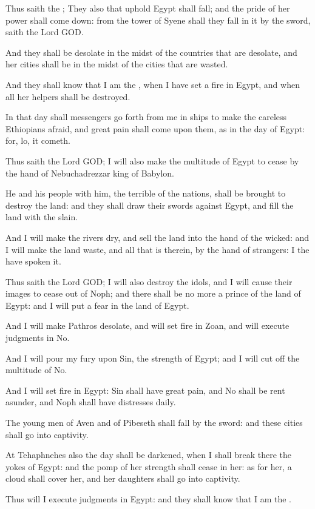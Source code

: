 \Verse Thus saith the \LORD; They also that uphold Egypt shall fall; and the pride of her power shall come down: from the tower of Syene shall they fall in it by the sword, saith the Lord GOD.

\Verse And they shall be desolate in the midst of the countries that are desolate, and her cities shall be in the midst of the cities that are wasted.

\Verse And they shall know that I am the \LORD, when I have set a fire in Egypt, and when all her helpers shall be destroyed.

\Verse In that day shall messengers go forth from me in ships to make the careless Ethiopians afraid, and great pain shall come upon them, as in the day of Egypt: for, lo, it cometh.

\Verse Thus saith the Lord GOD; I will also make the multitude of Egypt to cease by the hand of Nebuchadrezzar king of Babylon.

\Verse He and his people with him, the terrible of the nations, shall be brought to destroy the land: and they shall draw their swords against Egypt, and fill the land with the slain.

\Verse And I will make the rivers dry, and sell the land into the hand of the wicked: and I will make the land waste, and all that is therein, by the hand of strangers: I the \LORD have spoken it.

\Verse Thus saith the Lord GOD; I will also destroy the idols, and I will cause their images to cease out of Noph; and there shall be no more a prince of the land of Egypt: and I will put a fear in the land of Egypt.

\Verse And I will make Pathros desolate, and will set fire in Zoan, and will execute judgments in No.

\Verse And I will pour my fury upon Sin, the strength of Egypt; and I will cut off the multitude of No.

\Verse And I will set fire in Egypt: Sin shall have great pain, and No shall be rent asunder, and Noph shall have distresses daily.

\Verse The young men of Aven and of Pibeseth shall fall by the sword: and these cities shall go into captivity.

\Verse At Tehaphnehes also the day shall be darkened, when I shall break there the yokes of Egypt: and the pomp of her strength shall cease in her: as for her, a cloud shall cover her, and her daughters shall go into captivity.

\Verse Thus will I execute judgments in Egypt: and they shall know that I am the \LORD.

